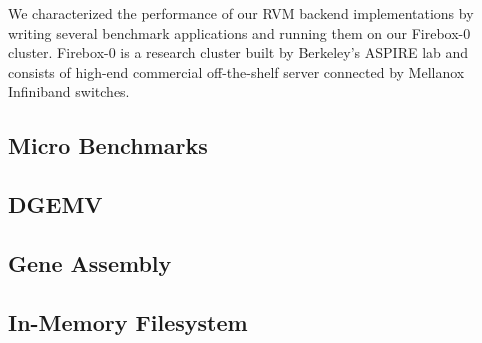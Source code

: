 We characterized the performance of our RVM backend implementations by writing
several benchmark applications and running them on our Firebox-0 cluster.
Firebox-0 is a research cluster built by Berkeley's ASPIRE lab and consists
of high-end commercial off-the-shelf server connected by Mellanox Infiniband
switches.


\subsection{Micro Benchmarks}



\subsection{DGEMV}



\subsection{Gene Assembly}



\subsection{In-Memory Filesystem}




